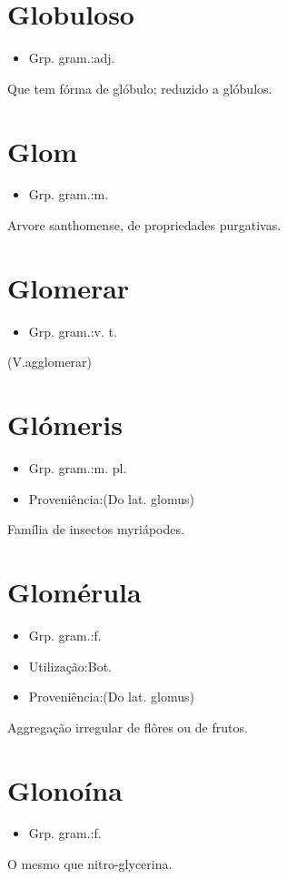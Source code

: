 \section{Globuloso}
\begin{itemize}
\item {Grp. gram.:adj.}
\end{itemize}
Que tem fórma de glóbulo; reduzido a glóbulos.
\section{Glom}
\begin{itemize}
\item {Grp. gram.:m.}
\end{itemize}
Arvore santhomense, de propriedades purgativas.
\section{Glomerar}
\begin{itemize}
\item {Grp. gram.:v. t.}
\end{itemize}
(V.agglomerar)
\section{Glómeris}
\begin{itemize}
\item {Grp. gram.:m. pl.}
\end{itemize}
\begin{itemize}
\item {Proveniência:(Do lat. \textunderscore glomus\textunderscore )}
\end{itemize}
Família de insectos myriápodes.
\section{Glomérula}
\begin{itemize}
\item {Grp. gram.:f.}
\end{itemize}
\begin{itemize}
\item {Utilização:Bot.}
\end{itemize}
\begin{itemize}
\item {Proveniência:(Do lat. \textunderscore glomus\textunderscore )}
\end{itemize}
Aggregação irregular de flôres ou de frutos.
\section{Glonoína}
\begin{itemize}
\item {Grp. gram.:f.}
\end{itemize}
O mesmo que \textunderscore nitro-glycerina\textunderscore .
